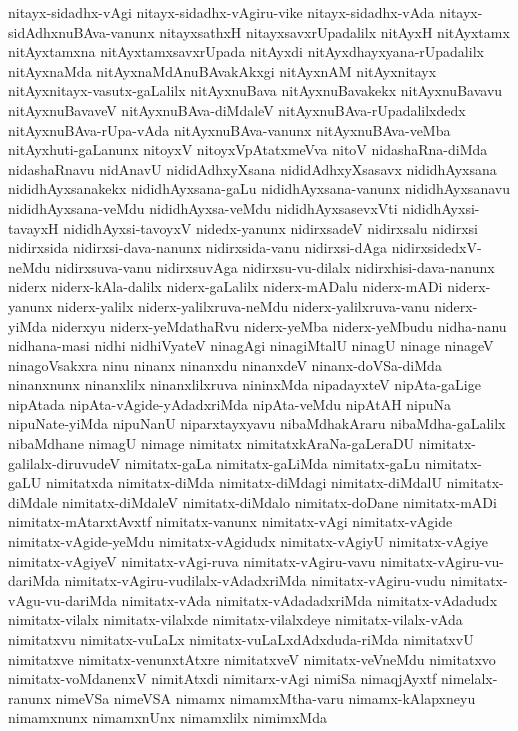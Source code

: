 {nitayx-sidadhx-vAgi
nitayx-sidadhx-vAgiru-vike
nitayx-sidadhx-vAda
nitayx-sidAdhxnuBAva-vanunx
nitayxsathxH
nitayxsavxrUpadalilx
nitAyxH
nitAyxtamx
nitAyxtamxna
nitAyxtamxsavxrUpada
nitAyxdi
nitAyxdhayxyana-rUpadalilx
nitAyxnaMda
nitAyxnaMdAnuBAvakAkxgi
nitAyxnAM
nitAyxnitayx
nitAyxnitayx-vasutx-gaLalilx
nitAyxnuBava
nitAyxnuBavakekx
nitAyxnuBavavu
nitAyxnuBavaveV
nitAyxnuBAva-diMdaleV
nitAyxnuBAva-rUpadalilxdedx
nitAyxnuBAva-rUpa-vAda
nitAyxnuBAva-vanunx
nitAyxnuBAva-veMba
nitAyxhuti-gaLanunx
nitoyxV
nitoyxVpAtatxmeVva
nitoV
nidashaRna-diMda
nidashaRnavu
nidAnavU
nididAdhxyXsana
nididAdhxyXsasavx
nididhAyxsana
nididhAyxsanakekx
nididhAyxsana-gaLu
nididhAyxsana-vanunx
nididhAyxsanavu
nididhAyxsana-veMdu
nididhAyxsa-veMdu
nididhAyxsasevxVti
nididhAyxsi-tavayxH
nididhAyxsi-tavoyxV
nidedx-yanunx
nidirxsadeV
nidirxsalu
nidirxsi
nidirxsida
nidirxsi-dava-nanunx
nidirxsida-vanu
nidirxsi-dAga
nidirxsidedxV-neMdu
nidirxsuva-vanu
nidirxsuvAga
nidirxsu-vu-dilalx
nidirxhisi-dava-nanunx
niderx
niderx-kAla-dalilx
niderx-gaLalilx
niderx-mADalu
niderx-mADi
niderx-yanunx
niderx-yalilx
niderx-yalilxruva-neMdu
niderx-yalilxruva-vanu
niderx-yiMda
niderxyu
niderx-yeMdathaRvu
niderx-yeMba
niderx-yeMbudu
nidha-nanu
nidhana-masi
nidhi
nidhiVyateV
ninagAgi
ninagiMtalU
ninagU
ninage
ninageV
ninagoVsakxra
ninu
ninanx
ninanxdu
ninanxdeV
ninanx-doVSa-diMda
ninanxnunx
ninanxlilx
ninanxlilxruva
nininxMda
nipadayxteV
nipAta-gaLige
nipAtada
nipAta-vAgide-yAdadxriMda
nipAta-veMdu
nipAtAH
nipuNa
nipuNate-yiMda
nipuNanU
niparxtayxyavu
nibaMdhakAraru
nibaMdha-gaLalilx
nibaMdhane
nimagU
nimage
nimitatx
nimitatxkAraNa-gaLeraDU
nimitatx-galilalx-diruvudeV
nimitatx-gaLa
nimitatx-gaLiMda
nimitatx-gaLu
nimitatx-gaLU
nimitatxda
nimitatx-diMda
nimitatx-diMdagi
nimitatx-diMdalU
nimitatx-diMdale
nimitatx-diMdaleV
nimitatx-diMdalo
nimitatx-doDane
nimitatx-mADi
nimitatx-mAtarxtAvxtf
nimitatx-vanunx
nimitatx-vAgi
nimitatx-vAgide
nimitatx-vAgide-yeMdu
nimitatx-vAgidudx
nimitatx-vAgiyU
nimitatx-vAgiye
nimitatx-vAgiyeV
nimitatx-vAgi-ruva
nimitatx-vAgiru-vavu
nimitatx-vAgiru-vu-dariMda
nimitatx-vAgiru-vudilalx-vAdadxriMda
nimitatx-vAgiru-vudu
nimitatx-vAgu-vu-dariMda
nimitatx-vAda
nimitatx-vAdadadxriMda
nimitatx-vAdadudx
nimitatx-vilalx
nimitatx-vilalxde
nimitatx-vilalxdeye
nimitatx-vilalx-vAda
nimitatxvu
nimitatx-vuLaLx
nimitatx-vuLaLxdAdxduda-riMda
nimitatxvU
nimitatxve
nimitatx-venunxtAtxre
nimitatxveV
nimitatx-veVneMdu
nimitatxvo
nimitatx-voMdanenxV
nimitAtxdi
nimitarx-vAgi
nimiSa
nimaqjAyxtf
nimelalx-ranunx
nimeVSa
nimeVSA
nimamx
nimamxMtha-varu
nimamx-kAlapxneyu
nimamxnunx
nimamxnUnx
nimamxlilx
nimimxMda
}
